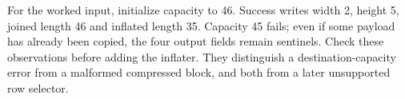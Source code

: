 For the worked input, initialize capacity to 46. Success writes width 2, height 5,
joined length 46 and inflated length 35. Capacity 45 fails; even if some payload has
already been copied, the four output fields remain sentinels. Check these observations
before adding the inflater. They distinguish a destination-capacity error from a
malformed compressed block, and both from a later unsupported row selector.
